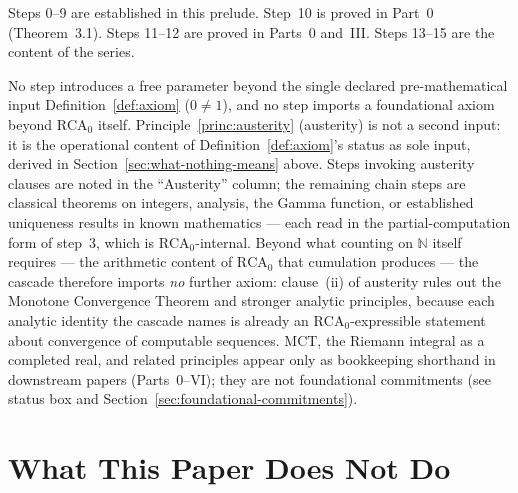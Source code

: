 \documentclass[11pt,a4paper]{article}
\begin{document}
\bigskip

Steps 0--9 are established in this prelude. Step~10 is proved in
Part~0 (Theorem~3.1). Steps 11--12 are proved in Parts~0 and~III.
Steps 13--15 are the content of the series.

No step introduces a free parameter beyond the single declared
pre-mathematical input Definition~\ref{def:axiom} ($0\neq 1$), and no
step imports a foundational axiom beyond $\mathrm{RCA}_0$ itself.
Principle~\ref{princ:austerity} (austerity) is not a second input:
it is the operational content of Definition~\ref{def:axiom}'s status
as sole input, derived in Section~\ref{sec:what-nothing-means} above.
Steps invoking austerity clauses are noted in the ``Austerity''
column; the remaining chain steps are classical theorems on
integers, analysis, the Gamma function, or established uniqueness
results in known mathematics --- each read in the partial-computation
form of step~3, which is $\mathrm{RCA}_0$-internal. Beyond what
counting on $\mathbb{N}$ itself requires --- the arithmetic content
of $\mathrm{RCA}_0$ that cumulation produces --- the cascade therefore
imports \emph{no} further axiom: clause~(ii) of austerity rules out
the Monotone Convergence Theorem and stronger analytic principles,
because each analytic identity the cascade names is already an
$\mathrm{RCA}_0$-expressible statement about convergence of
computable sequences. $\mathrm{MCT}$, the
Riemann integral as a completed real, and related principles appear
only as bookkeeping shorthand in downstream papers (Parts~0--VI);
they are not foundational commitments (see status box and
Section~\ref{sec:foundational-commitments}).

\section{What This Paper Does Not Do}
\label{sec:what-not}
\end{document}
